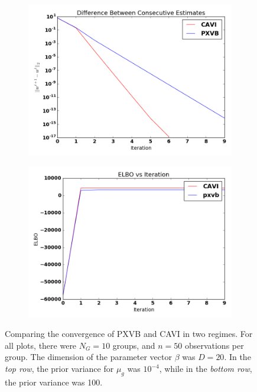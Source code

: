 \documentclass{article}
\begin{document}
\begin{figure}[tb]
\begin{subfigure}[t]{0.49\textwidth}
        \subcaption{}
    \end{subfigure}
    \begin{subfigure}[t]{0.49\textwidth}
        \includegraphics[width=\textwidth]{LMM/pw_lmm_smallvar.png}
        \subcaption{}
    \end{subfigure}
          \begin{subfigure}[t]{0.49\textwidth}
        \includegraphics[width=\textwidth]{LMM/elbo_lmm_smallvar.png}
            \subcaption{}
    \end{subfigure}
    \caption{Comparing the convergence of PXVB and CAVI in two regimes. For all plots, there were $N_G = 10$ groups, and $n = 50$ observations per group. The dimension of the parameter vector $\beta$ was $D = 20$. In the {\itshape top row}, the prior variance for $\mu_g$ was $10^{-4}$, while in the {\itshape bottom row}, the prior variance was 100. } %
    \label{fig:lmm}
\end{figure}
\end{document}
